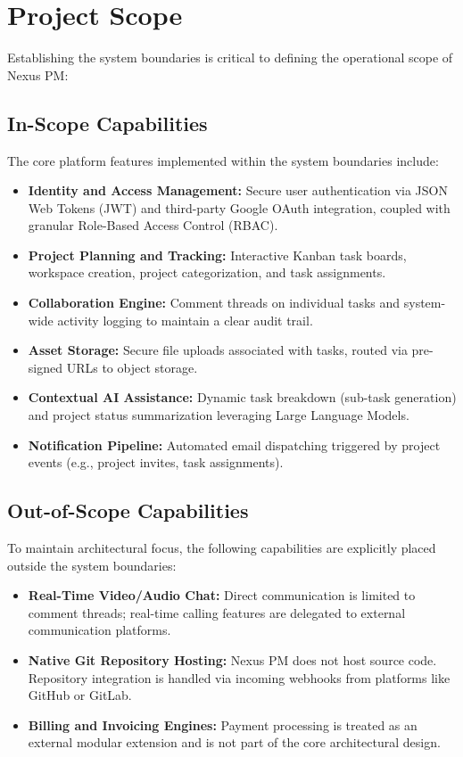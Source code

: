 \section{Project Scope}
Establishing the system boundaries is critical to defining the operational scope of Nexus PM:

\subsection{In-Scope Capabilities}
The core platform features implemented within the system boundaries include:
\begin{itemize}
    \item \textbf{Identity and Access Management:} Secure user authentication via JSON Web Tokens (JWT) and third-party Google OAuth integration, coupled with granular Role-Based Access Control (RBAC).
    \item \textbf{Project Planning and Tracking:} Interactive Kanban task boards, workspace creation, project categorization, and task assignments.
    \item \textbf{Collaboration Engine:} Comment threads on individual tasks and system-wide activity logging to maintain a clear audit trail.
    \item \textbf{Asset Storage:} Secure file uploads associated with tasks, routed via pre-signed URLs to object storage.
    \item \textbf{Contextual AI Assistance:} Dynamic task breakdown (sub-task generation) and project status summarization leveraging Large Language Models.
    \item \textbf{Notification Pipeline:} Automated email dispatching triggered by project events (e.g., project invites, task assignments).
\end{itemize}

\subsection{Out-of-Scope Capabilities}
To maintain architectural focus, the following capabilities are explicitly placed outside the system boundaries:
\begin{itemize}
    \item \textbf{Real-Time Video/Audio Chat:} Direct communication is limited to comment threads; real-time calling features are delegated to external communication platforms.
    \item \textbf{Native Git Repository Hosting:} Nexus PM does not host source code. Repository integration is handled via incoming webhooks from platforms like GitHub or GitLab.
    \item \textbf{Billing and Invoicing Engines:} Payment processing is treated as an external modular extension and is not part of the core architectural design.
\end{itemize}

